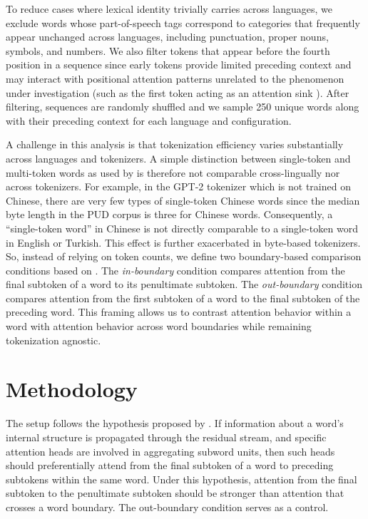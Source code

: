 \documentclass[11pt]{article}
\begin{document}
To reduce cases where lexical identity trivially carries across languages, we exclude words whose part-of-speech tags correspond to categories that frequently appear unchanged across languages, including punctuation, proper nouns, symbols, and numbers. We also filter tokens that appear before the fourth position in a sequence since early tokens provide limited preceding context and may interact with positional attention patterns unrelated to the phenomenon under investigation (such as the first token acting as an attention sink \citep{xiao2024efficient}). After filtering, sequences are randomly shuffled and we sample 250 unique words along with their preceding context for each language and configuration.

A challenge in this analysis is that tokenization efficiency varies substantially across languages and tokenizers. A simple distinction between single-token and multi-token words as used by \citet{kaplan2025} is therefore not comparable cross-lingually nor across tokenizers. For example, in the GPT-2 tokenizer which is not trained on Chinese, there are very few types of single-token Chinese words since the median byte length in the PUD corpus is three for Chinese words. Consequently, a ``single-token word'' in Chinese is not directly comparable to a single-token word in English or Turkish. This effect is further exacerbated in byte-based tokenizers. So, instead of relying on token counts, we define two boundary-based comparison conditions based on \citet{kaplan2025, ferrando2024}. The \textit{in-boundary} condition compares attention from the final subtoken of a word to its penultimate subtoken. The \textit{out-boundary} condition compares attention from the first subtoken of a word to the final subtoken of the preceding word. This framing allows us to contrast attention behavior within a word with attention behavior across word boundaries while remaining tokenization agnostic.

\section{Methodology}

The setup follows the hypothesis proposed by \citet{kaplan2025}. If information about a word's internal structure is propagated through the residual stream, and specific attention heads are involved in aggregating subword units, then such heads should preferentially attend from the final subtoken of a word to preceding subtokens within the same word. Under this hypothesis, attention from the final subtoken to the penultimate subtoken should be stronger than attention that crosses a word boundary. The out-boundary condition serves as a control.
\end{document}
